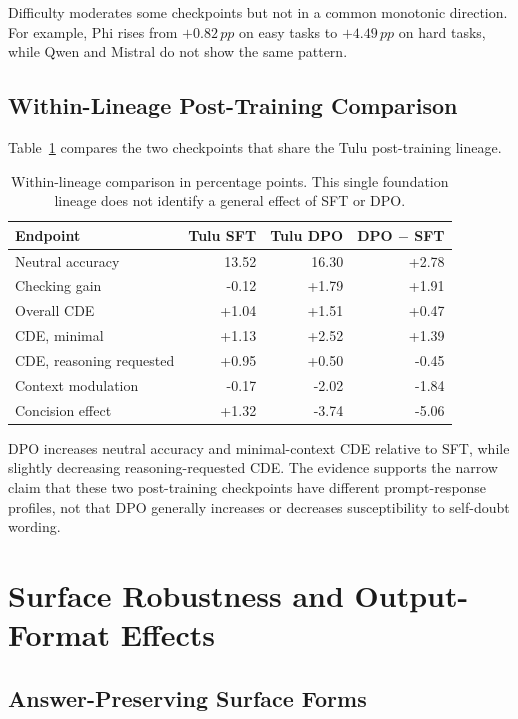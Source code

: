 \documentclass[sigconf,anonymous,review]{acmart}
\newcommand{\pp}{\,pp}
\begin{document}


Difficulty moderates some checkpoints but not in a common monotonic direction.
For example, Phi rises from $+0.82\pp$ on easy tasks to $+4.49\pp$ on hard
tasks, while Qwen and Mistral do not show the same pattern.

\subsection{Within-Lineage Post-Training Comparison}

Table~\ref{tab:tulu} compares the two checkpoints that share the Tulu
post-training lineage.

\begin{table}[H]
\centering\small
\begin{tabular}{@{}lrrr@{}}
\toprule
Endpoint & Tulu SFT & Tulu DPO & DPO $-$ SFT \\
\midrule
Neutral accuracy & 13.52 & 16.30 & +2.78 \\
Checking gain & -0.12 & +1.79 & +1.91 \\
Overall CDE & +1.04 & +1.51 & +0.47 \\
CDE, minimal & +1.13 & +2.52 & +1.39 \\
CDE, reasoning requested & +0.95 & +0.50 & -0.45 \\
Context modulation & -0.17 & -2.02 & -1.84 \\
Concision effect & +1.32 & -3.74 & -5.06 \\
\bottomrule
\end{tabular}
\caption{Within-lineage comparison in percentage points. This single
foundation lineage does not identify a general effect of SFT or DPO.}
\label{tab:tulu}
\end{table}

DPO increases neutral accuracy and minimal-context CDE relative to SFT, while
slightly decreasing reasoning-requested CDE. The evidence supports the narrow
claim that these two post-training checkpoints have different prompt-response
profiles, not that DPO generally increases or decreases susceptibility to
self-doubt wording.

\section{Surface Robustness and Output-Format Effects}

\subsection{Answer-Preserving Surface Forms}
\end{document}

